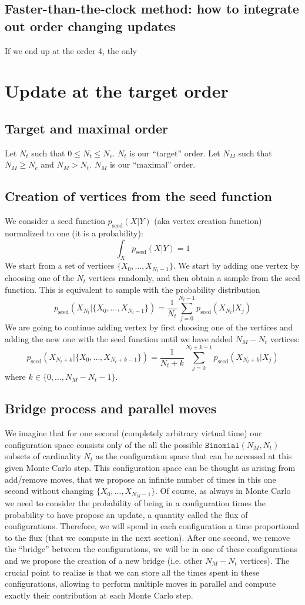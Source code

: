 \documentclass{article}
\begin{document}
\subsection{Faster-than-the-clock method: how to integrate out order changing updates}
If we end up at the order 4, the only 

\section{Update at the target order }
\subsection{Target and maximal order}
Let $N_t$ such that $0\le N_t\le N_c$. $N_t$ is  our ``target'' order. Let $N_M$ such that $N_M\ge N_c$ and $N_M>N_t$. $N_M$ is our ``maximal'' order.
\subsection{Creation of vertices from the seed function}
We consider a seed function $p_{\text{seed}}(X|Y)$ (aka vertex creation function) normalized to one (it is a probability):
$$
\int_X p_{\text{seed}}(X|Y)=1
$$
We start from a set of vertices $\{X_0,\dots, X_{N_t-1}\}$. We start by adding one vertex by choosing one of the $N_t$ vertices randomly, and then obtain a sample from the seed function. This is equivalent to sample with the probability distribution
$$
p_{\text{seed}}(X_{N_t}|\{X_0,\dots,X_{N_t-1}\})=\frac{1}{N_t}\sum_{j=0}^{N_t-1} p_{\text{seed}}(X_{N_t}|X_j)
$$
We are going to continue adding vertex by first choosing one of the vertices and adding the new one with the seed function until we have added $N_M-N_t$ vertices:
$$
p_{\text{seed}}(X_{N_t+k}|\{X_0,\dots,X_{N_t+k-1}\})=\frac{1}{N_t+k}\sum_{j=0}^{N_t+k-1} p_{\text{seed}}(X_{N_t+k}|X_j)
$$
where $k\in\{0,\dots, N_M-N_t-1\}$.
\subsection{Bridge process and parallel moves}
We imagine that for one second (completely arbitrary virtual time) our configuration space consists only of the all the possible $\texttt{Binomial}(N_M,N_t)$ subsets of cardinality $N_t$ as the configuration space that can be accessed at this given Monte Carlo step. This configuration space can be thought as arising from add/remove moves, that we propose an infinite number of times in this one second without changing $\{X_0,\dots,X_{N_M-1}\}$. Of course, as always in Monte Carlo we need to consider the probability of being in a configuration times the probability to have propose an update, a quantity called the flux of configurations. Therefore, we will spend in each configuration a time proportional to the flux (that we compute in the next section). After one second, we remove the ``bridge'' between the configurations, we will be in one of these configurations and we propose the creation of a new bridge (i.e. other $N_M-N_t$ vertices). The crucial point to realize is that we can store all the times spent in these configurations, allowing to perform multiple moves in parallel and compute exactly their contribution at each Monte Carlo step.
\end{document}
